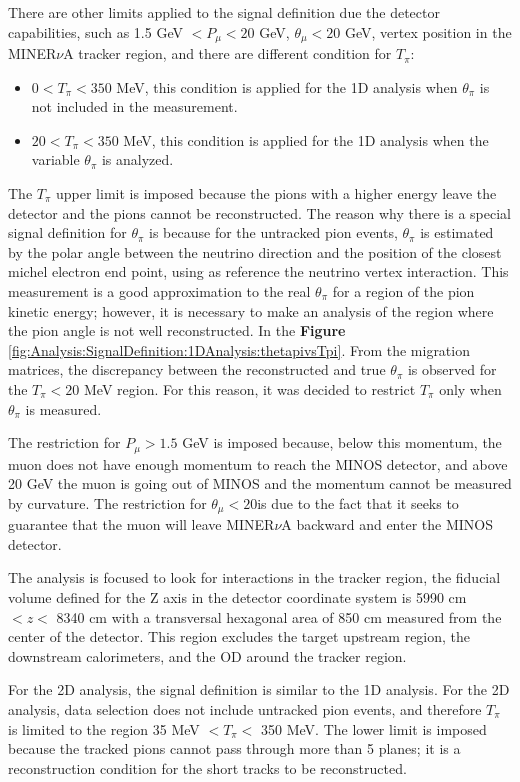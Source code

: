 There are other limits applied to the signal definition due the detector capabilities, such as 1.5 GeV $<P_\mu<20$ GeV, $\theta_\mu<20$ GeV, vertex position in the MINER$\nu$A tracker region, and there are  different condition for $T_\pi$:
\begin{itemize}
    \item $0<T_\pi<350$ MeV, this condition is applied for the 1D analysis when $\theta_\pi$ is not included in the measurement.  
    \item $20<T_\pi<350$ MeV, this condition is applied for the 1D analysis when the variable $\theta_\pi$ is analyzed. 
\end{itemize}

The $T_\pi$ upper limit is imposed because the pions with a higher energy leave the detector and the pions cannot be reconstructed. The reason why there is a special signal definition for $\theta_\pi$ is because for the untracked pion events, $\theta_\pi$ is estimated by the polar angle between the neutrino direction and the position of the closest michel electron end point, using as reference the neutrino vertex interaction. This measurement is a good approximation to the real $\theta_\pi$ for a region of the pion kinetic energy; however, it is necessary to make an analysis of the region where the pion angle is not well reconstructed. In the \textbf{Figure} \ref{fig:Analysis:SignalDefinition:1DAnalysis:thetapivsTpi}. From the migration matrices, the discrepancy between the reconstructed and true $\theta_\pi$ is observed for the $T_\pi < 20$ MeV region. For this reason, it was decided to restrict $T_\pi$ only when $\theta_\pi$ is measured. 

The restriction for $P_\mu>1.5$ GeV is imposed because, below this momentum, the muon does not have enough momentum to reach the MINOS detector, and above 20 GeV the muon is going out of MINOS and the momentum cannot be measured by curvature. The restriction for $\theta_\mu < 20$\textdegree is due to the fact that it seeks to guarantee that the muon will leave MINER$\nu$A backward and enter the MINOS detector.

The analysis is focused to look for interactions in the tracker region, the fiducial volume defined for the Z axis in the detector coordinate system is 5990 cm $< z <$ 8340 cm with a transversal hexagonal area of 850 cm measured from the center of the detector. This region excludes the target upstream region, the downstream calorimeters, and the OD around the tracker region. 

For the 2D analysis, the signal definition is similar to the 1D analysis. For the 2D analysis, data selection does not include untracked pion events, and therefore $T_\pi$ is limited to the region 35 MeV $<T_\pi<$ 350 MeV. The lower limit is imposed because the tracked pions cannot pass through more than 5 planes; it is a reconstruction condition for the short tracks to be reconstructed. 


